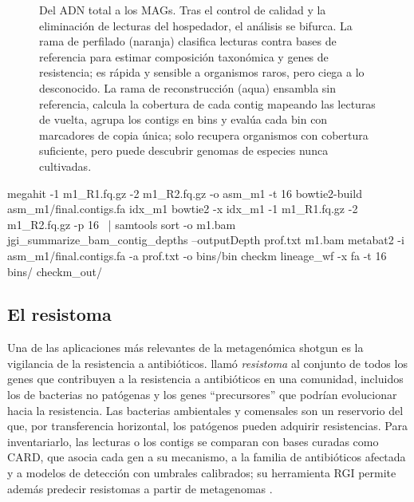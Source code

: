 \begin{figure}[t]
\begin{tikzpicture}[font=\sffamily\scriptsize, x=0.9cm,
   paso/.style={draw=#1, fill=#1!10, rounded corners=3pt, minimum height=9mm, text width=1.95cm, align=center, text=tinta},
   paso/.default=azul]
\end{tikzpicture}
\caption[Flujo de la metagenómica shotgun]{Del ADN total a los MAGs. Tras el control de calidad y la eliminación de lecturas del hospedador, el análisis se bifurca. La rama de perfilado (naranja) clasifica lecturas contra bases de referencia para estimar composición taxonómica y genes de resistencia; es rápida y sensible a organismos raros, pero ciega a lo desconocido. La rama de reconstrucción (aqua) ensambla sin referencia, calcula la cobertura de cada contig mapeando las lecturas de vuelta, agrupa los contigs en bins y evalúa cada bin con marcadores de copia única; solo recupera organismos con cobertura suficiente, pero puede descubrir genomas de especies nunca cultivadas.}
\label{fig:14-flujo}
\end{figure}

\begin{consola}
megahit -1 m1_R1.fq.gz -2 m1_R2.fq.gz -o asm_m1 -t 16
bowtie2-build asm_m1/final.contigs.fa idx_m1
bowtie2 -x idx_m1 -1 m1_R1.fq.gz -2 m1_R2.fq.gz -p 16 \
  | samtools sort -o m1.bam
jgi_summarize_bam_contig_depths --outputDepth prof.txt m1.bam
metabat2 -i asm_m1/final.contigs.fa -a prof.txt -o bins/bin
checkm lineage_wf -x fa -t 16 bins/ checkm_out/
\end{consola}

\subsection{El resistoma}

Una de las aplicaciones más relevantes de la metagenómica shotgun es la vigilancia de la resistencia a antibióticos. \textcite{c14-wright2007} llamó \emph{resistoma} al conjunto de todos los genes que contribuyen a la resistencia a antibióticos en una comunidad, incluidos los de bacterias no patógenas y los genes ``precursores'' que podrían evolucionar hacia la resistencia. Las bacterias ambientales y comensales son un reservorio del que, por transferencia horizontal, los patógenos pueden adquirir resistencias. Para inventariarlo, las lecturas o los contigs se comparan con bases curadas como CARD, que asocia cada gen a su mecanismo, a la familia de antibióticos afectada y a modelos de detección con umbrales calibrados; su herramienta RGI permite además predecir resistomas a partir de metagenomas \parencite{c14-alcock2023}.


